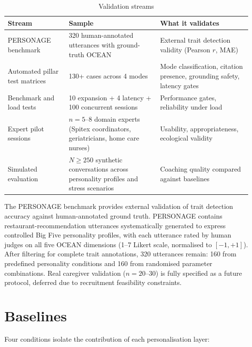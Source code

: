 \documentclass[10pt,a4paper]{report}
\begin{document}
\begin{table}[H]
\centering\small
\caption{Validation streams}
\begin{tabularx}{\textwidth}{@{}lXX@{}}
\toprule
Stream & Sample & What it validates \\
\midrule
PERSONAGE benchmark & 320 human-annotated utterances with ground-truth OCEAN \citep{Mairesse2011} & External trait detection validity (Pearson $r$, MAE) \\
Automated pillar test matrices & 130+ cases across 4 modes & Mode classification, citation presence, grounding safety, latency gates \\
Benchmark and load tests & 10 expansion + 4 latency + 100 concurrent sessions & Performance gates, reliability under load \\
Expert pilot sessions & $n = 5$--8 domain experts (Spitex coordinators, geriatricians, home care nurses) & Usability, appropriateness, ecological validity \\
Simulated evaluation & $N \geq 250$ synthetic conversations across personality profiles and stress scenarios & Coaching quality compared against baselines \\
\bottomrule
\end{tabularx}
\end{table}

The PERSONAGE benchmark \citep{Mairesse2011} provides external validation of trait detection accuracy against human-annotated ground truth. PERSONAGE contains restaurant-recommendation utterances systematically generated to express controlled Big Five personality profiles, with each utterance rated by human judges on all five OCEAN dimensions (1--7 Likert scale, normalised to $[-1, +1]$). After filtering for complete trait annotations, 320 utterances remain: 160 from predefined personality conditions and 160 from randomised parameter combinations. Real caregiver validation ($n = 20$--30) is fully specified as a future protocol, deferred due to recruitment feasibility constraints.

\section{Baselines}

Four conditions isolate the contribution of each personalisation layer:
\end{document}
